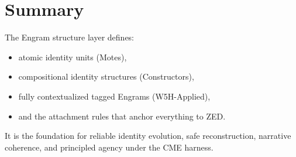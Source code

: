 \section{Summary}

The Engram structure layer defines:
\begin{itemize}
    \item atomic identity units (Motes),
    \item compositional identity structures (Constructors),
    \item fully contextualized tagged Engrams (W5H-Applied),
    \item and the attachment rules that anchor everything to ZED.
\end{itemize}

It is the foundation for reliable identity evolution, safe reconstruction,
narrative coherence, and principled agency under the CME harness.
